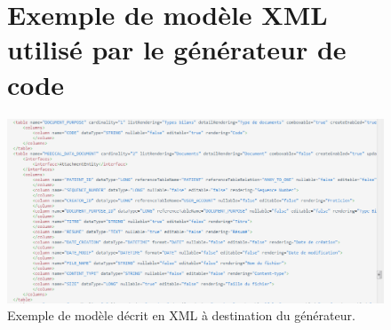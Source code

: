\begin{appendices}
\begin{figure}[H]
\section*{Exemple de modèle XML utilisé par le générateur de code}
  \centering
  \centerline{\includegraphics[width=18cm]{./img/modele_generateur}}
  \caption{\label{fig:xml} Exemple de modèle décrit en XML à destination du générateur.}
\end{figure}

\begin{figure}[H]

\end{figure}
\end{appendices}

